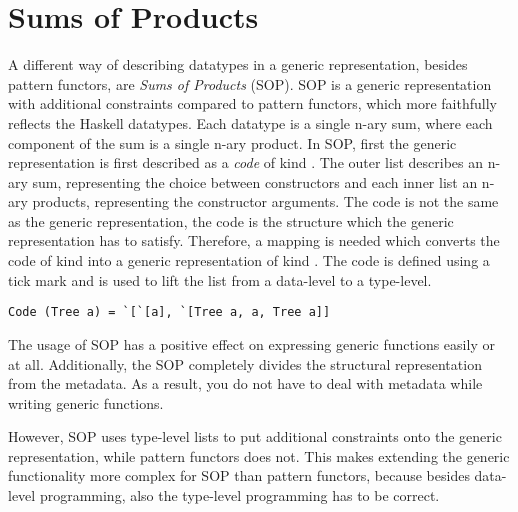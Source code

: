 \section{Sums of Products}
A different way of describing datatypes in a generic representation, besides pattern functors, are \textit{Sums of Products}\cite{vries2014sums} (SOP). SOP is a generic representation with additional constraints compared to pattern functors, which more faithfully reflects the Haskell datatypes. Each datatype is a single n-ary sum, where each component of the sum is a single n-ary product. In SOP, first the generic representation is first described as a \textit{code} of kind \inlinehaskell{[[*]]}. The outer list describes an n-ary sum, representing the choice between constructors and each inner list an n-ary products, representing the constructor arguments. The code is not the same as the generic representation, the code is the structure which the generic representation has to satisfy. Therefore, a mapping is needed which converts the code of kind \inlinehaskell{[[*]]} into a generic representation of kind \inlinehaskell{*}. The code is defined using a tick mark  and is used to lift the list from a data-level to a type-level. 

\begin{verbatim}
Code (Tree a) = `[`[a], `[Tree a, a, Tree a]]
\end{verbatim}

The usage of SOP has a positive effect on expressing generic functions easily or at all. Additionally, the SOP completely divides the structural representation from the metadata. As a result, you do not have to deal with metadata while writing generic functions. 

However, SOP uses type-level lists to put additional constraints onto the generic representation, while pattern functors does not. This makes extending the generic functionality more complex for SOP than pattern functors, because besides data-level programming, also the type-level programming has to be correct.